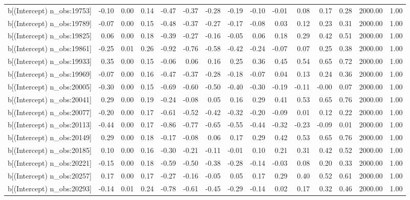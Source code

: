 \begin{table}[ht]
\begin{tabular}{rrrrrrrrrrrrrrr}
  b[(Intercept) n\_obs:19753] & -0.10 & 0.00 & 0.14 & -0.47 & -0.37 & -0.28 & -0.19 & -0.10 & -0.01 & 0.08 & 0.17 & 0.28 & 2000.00 & 1.00 \\ 
  b[(Intercept) n\_obs:19789] & -0.07 & 0.00 & 0.15 & -0.48 & -0.37 & -0.27 & -0.17 & -0.08 & 0.03 & 0.12 & 0.23 & 0.31 & 2000.00 & 1.00 \\ 
  b[(Intercept) n\_obs:19825] & 0.06 & 0.00 & 0.18 & -0.39 & -0.27 & -0.16 & -0.05 & 0.06 & 0.18 & 0.29 & 0.42 & 0.51 & 2000.00 & 1.00 \\ 
  b[(Intercept) n\_obs:19861] & -0.25 & 0.01 & 0.26 & -0.92 & -0.76 & -0.58 & -0.42 & -0.24 & -0.07 & 0.07 & 0.25 & 0.38 & 2000.00 & 1.00 \\ 
  b[(Intercept) n\_obs:19933] & 0.35 & 0.00 & 0.15 & -0.06 & 0.06 & 0.16 & 0.25 & 0.36 & 0.45 & 0.54 & 0.65 & 0.72 & 2000.00 & 1.00 \\ 
  b[(Intercept) n\_obs:19969] & -0.07 & 0.00 & 0.16 & -0.47 & -0.37 & -0.28 & -0.18 & -0.07 & 0.04 & 0.13 & 0.24 & 0.36 & 2000.00 & 1.00 \\ 
  b[(Intercept) n\_obs:20005] & -0.30 & 0.00 & 0.15 & -0.69 & -0.60 & -0.50 & -0.40 & -0.30 & -0.19 & -0.11 & -0.00 & 0.07 & 2000.00 & 1.00 \\ 
  b[(Intercept) n\_obs:20041] & 0.29 & 0.00 & 0.19 & -0.24 & -0.08 & 0.05 & 0.16 & 0.29 & 0.41 & 0.53 & 0.65 & 0.76 & 2000.00 & 1.00 \\ 
  b[(Intercept) n\_obs:20077] & -0.20 & 0.00 & 0.17 & -0.61 & -0.52 & -0.42 & -0.32 & -0.20 & -0.09 & 0.01 & 0.12 & 0.22 & 2000.00 & 1.00 \\ 
  b[(Intercept) n\_obs:20113] & -0.44 & 0.00 & 0.17 & -0.86 & -0.77 & -0.65 & -0.55 & -0.44 & -0.32 & -0.23 & -0.09 & 0.01 & 2000.00 & 1.00 \\ 
  b[(Intercept) n\_obs:20149] & 0.29 & 0.00 & 0.18 & -0.17 & -0.08 & 0.06 & 0.17 & 0.29 & 0.42 & 0.53 & 0.65 & 0.76 & 2000.00 & 1.00 \\ 
  b[(Intercept) n\_obs:20185] & 0.10 & 0.00 & 0.16 & -0.30 & -0.21 & -0.11 & -0.01 & 0.10 & 0.21 & 0.31 & 0.42 & 0.52 & 2000.00 & 1.00 \\ 
  b[(Intercept) n\_obs:20221] & -0.15 & 0.00 & 0.18 & -0.59 & -0.50 & -0.38 & -0.28 & -0.14 & -0.03 & 0.08 & 0.20 & 0.33 & 2000.00 & 1.00 \\ 
  b[(Intercept) n\_obs:20257] & 0.17 & 0.00 & 0.17 & -0.27 & -0.16 & -0.05 & 0.05 & 0.17 & 0.29 & 0.40 & 0.52 & 0.61 & 2000.00 & 1.00 \\ 
  b[(Intercept) n\_obs:20293] & -0.14 & 0.01 & 0.24 & -0.78 & -0.61 & -0.45 & -0.29 & -0.14 & 0.02 & 0.17 & 0.32 & 0.46 & 2000.00 & 1.00 \\ 

\end{tabular}
\end{table}
